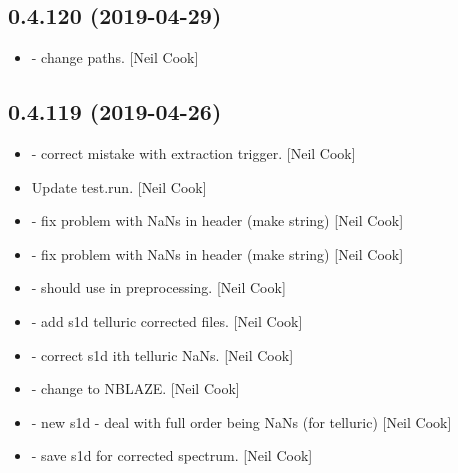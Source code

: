 \documentclass[a4paper,10pt,english]{report}
\begin{document}
\subsection{0.4.120 (2019-04-29)}
\label{\detokenize{misc/changelog:id140}}\begin{itemize}
\item {} 
 - change paths. {[}Neil Cook{]}

\end{itemize}


\subsection{0.4.119 (2019-04-26)}
\label{\detokenize{misc/changelog:id141}}\begin{itemize}
\item {} 
 - correct mistake with extraction trigger. {[}Neil
Cook{]}

\item {} 
Update test.run. {[}Neil Cook{]}

\item {} 
 - fix problem with NaNs in header (make string) {[}Neil
Cook{]}

\item {} 
 - fix problem with NaNs in header (make string) {[}Neil
Cook{]}

\item {} 
 - should use  in preprocessing. {[}Neil
Cook{]}

\item {} 
 - add s1d telluric corrected files. {[}Neil Cook{]}

\item {} 
 - correct s1d ith telluric NaNs. {[}Neil Cook{]}

\item {} 
 - change to NBLAZE. {[}Neil Cook{]}

\item {} 
 - new s1d - deal with full order being NaNs (for
telluric) {[}Neil Cook{]}

\item {} 
 - save s1d for corrected spectrum. {[}Neil Cook{]}


\end{itemize}
\end{document}
